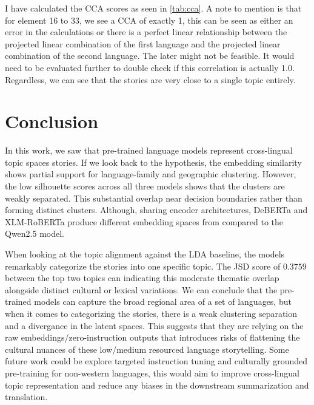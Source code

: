 \documentclass[11pt]{article} %
\begin{document}
    I have calculated the CCA scores as seen in \autoref{tab:cca}. A note to mention
    is that for element 16 to 33, we see a CCA of exactly 1, this can be seen as either
    an error in the calculations or there is a perfect linear relationship between
    the projected linear combination of the first language and the projected linear
    combination of the second language. The later might not be feasible. It would
    need to be evaluated further to double check if this correlation is actually 1.0.
    Regardless, we can see that the stories are very close to a single topic entirely.

    \section{Conclusion}
    In this work, we saw that pre-trained language models represent cross-lingual
    topic spaces stories. If we look back to the hypothesis, the embedding
    similarity shows partial support for language-family and geographic
    clustering. However, the low silhouette scores across all three models shows
    that the clusters are weakly separated. This substantial overlap near decision
    boundaries rather than forming distinct clusters. Although, sharing encoder architectures,
    DeBERTa and XLM-RoBERTa produce different embedding spaces from compared to
    the Qwen2.5 model.

    When looking at the topic alignment against the LDA baseline, the models
    remarkably categorize the stories into one specific topic. The JSD score of $0
    .3759$ between the top two topics can indicating this moderate thematic overlap
    alongside distinct cultural or lexical variations. We can conclude that the
    pre-trained models can capture the broad regional area of a set of languages,
    but when it comes to categorizing the stories, there is a weak clustering
    separation and a divergance in the latent spaces. This suggests that they are
    relying on the raw embeddings/zero-instruction outputs that introduces risks of
    flattening the cultural nuances of these low/medium resourced language storytelling.
    Some future work could be explore targeted instruction tuning and culturally
    grounded pre-training for non-western languages, this would aim to improve cross-lingual
    topic representation and reduce any biases in the downstream summarization and
    translation.
\end{document}
